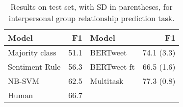 \begin{table}[t]
	\centering
	\begin{tabular}{lr|lr}
		\toprule
		\textbf{Model} & \textbf{F1} & \textbf{Model} & \textbf{F1} \\ \midrule
		Majority class & 51.1 & BERTweet & 74.1 (3.3) \\
		Sentiment-Rule & 56.3 & BERTweet-ft & 66.5 (1.6) \\
		NB-SVM & 62.5 & Multitask & 77.3 (0.8) \\
        Human & 66.7 & & \\
        \bottomrule
	\end{tabular}
	\caption{Results on test set, with SD in parentheses, for interpersonal group relationship prediction task.}
	\label{tab:inoutresults}
\end{table}
